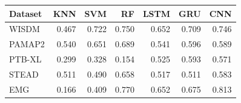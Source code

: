 \begin{tabular}{@{}lrrrrrr@{}}
\toprule
Dataset & KNN & SVM & RF & LSTM & GRU & CNN \\
\midrule
WISDM & 0.467 & 0.722 & 0.750 & 0.652 & 0.709 & 0.746 \\
PAMAP2 & 0.540 & 0.651 & 0.689 & 0.541 & 0.596 & 0.589 \\
PTB-XL & 0.299 & 0.328 & 0.154 & 0.525 & 0.593 & 0.571 \\
STEAD & 0.511 & 0.490 & 0.658 & 0.517 & 0.511 & 0.583 \\
EMG & 0.166 & 0.409 & 0.770 & 0.652 & 0.675 & 0.813 \\
\bottomrule
\end{tabular}
